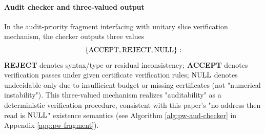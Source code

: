 \paragraph{Audit checker and three-valued output}
In the audit-priority fragment interfacing with unitary slice verification mechanism, the checker outputs three values
$$
\{\mathrm{ACCEPT},\mathrm{REJECT},\mathrm{NULL}\}:
$$
\textbf{REJECT} denotes syntax/type or residual inconsistency;
\textbf{ACCEPT} denotes verification passes under given certificate verification rules;
\textbf{$\mathrm{NULL}$} denotes undecidable only due to insufficient budget or missing certificates (not "numerical instability").
This three-valued mechanism realizes "auditability" as a deterministic verification procedure, consistent with this paper's "no address then read is $\mathrm{NULL}$" existence semantics (see Algorithm \ref{alg:pw-aud-checker} in Appendix \ref{app:pw-fragment}).\par
